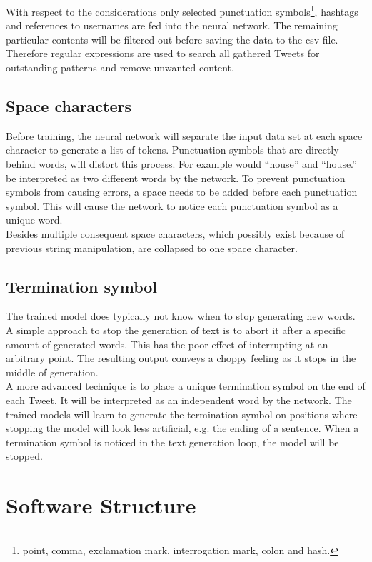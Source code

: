\documentclass[conference]{IEEEtran}
\begin{document}
With respect to the considerations only selected punctuation symbols\footnote{point, comma, exclamation mark, interrogation mark, colon and hash.},  hashtags and references to usernames are fed into the neural network. The remaining particular contents will be filtered out before saving the data to the csv file. Therefore regular expressions are used to search all gathered Tweets for outstanding patterns and remove unwanted content.

\subsection{Space characters}\label{subsec_space_characters}

Before training, the neural network will separate the input data set at each space character to generate a list of tokens. Punctuation symbols that are directly behind words, will distort this process. For example would ``house'' and ``house.'' be interpreted as two different words by the network. To prevent punctuation symbols from causing errors, a space needs to be added before each punctuation symbol. This will cause the network to notice each punctuation symbol as a unique word.\\
Besides multiple consequent space characters, which possibly exist because of previous string manipulation, are collapsed to one space character.

\subsection{Termination symbol}\label{subsec_termination_symbol}

The trained model does typically not know when to stop generating new words. A simple approach to stop the generation of text is to abort it after a specific amount of generated words. This has the poor effect of interrupting at an arbitrary point. The resulting output conveys a choppy feeling as it stops in the middle of generation.\\
A more advanced technique is to place a unique termination symbol on the end of each Tweet. It will be interpreted as an independent word by the network. The trained models will learn to generate the termination symbol on positions where stopping the model will look less artificial, e.g. the ending of a sentence. When a termination symbol is noticed in the text generation loop, the model will be stopped.

\section{Software Structure}
\end{document}
